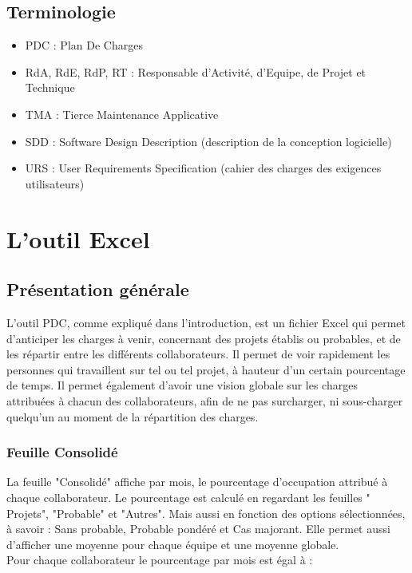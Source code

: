 \documentclass[french]{report}
\begin{document}
  \section{Terminologie}
\begin{itemize}[label=\textbullet, font=\normalfont \color{blue}]
  \item{PDC : Plan De Charges}
  \item{RdA, RdE, RdP, RT : Responsable d'Activité, d'Equipe, de Projet et Technique}
  \item{TMA : Tierce Maintenance Applicative}
  \item{SDD : Software Design Description (description de la conception logicielle)}
  \item{URS : User Requirements Specification (cahier des charges des exigences utilisateurs)}
\end{itemize}

\chapter{L'outil Excel}
  \section{Présentation générale}

L’outil PDC, comme expliqué dans l’introduction, est un fichier Excel qui permet
d’anticiper les charges à venir, concernant des projets établis ou probables, et
de les répartir entre les différents collaborateurs. Il permet de voir
rapidement les personnes qui travaillent sur tel ou tel projet, à hauteur d’un
certain pourcentage de temps. Il permet également d’avoir une vision globale sur les
charges attribuées à chacun des collaborateurs, afin de ne pas surcharger, ni sous-charger
quelqu’un au moment de la répartition des charges.

\subsection{Feuille Consolidé}

La feuille "Consolidé" affiche par mois, le pourcentage d'occupation attribué à chaque
collaborateur. Le pourcentage est calculé en regardant les feuilles "
Projets", "Probable" et "Autres". Mais aussi en fonction des options
sélectionnées, à savoir : Sans probable, Probable pondéré et Cas majorant. Elle
permet aussi d'afficher une moyenne pour chaque équipe et une moyenne globale.\\
Pour chaque collaborateur le pourcentage par mois est égal à :
\end{document}
